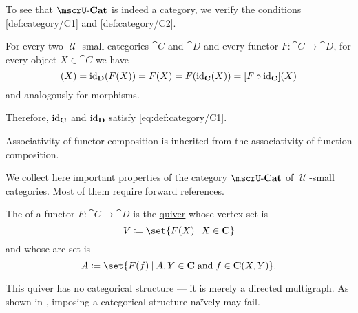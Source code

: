 \begin{defproof}
  To see that \( \ucat{Cat} \) is indeed a category, we verify the conditions \ref{def:category/C1} and \ref{def:category/C2}.

   For every two \( \mscrU \)-small categories \( \cat{C} \) and \( \cat{D} \) and every functor \( F: \cat{C} \to \cat{D} \), for every object \( X \in \cat{C} \) we have
  \begin{equation*}
    [\id_{\cat{D}} \bincirc F](X)
    =
    \id_{\cat{D}}(F(X))
    =
    F(X)
    =
    F(\id_{\cat{C}}(X))
    =
    [F \bincirc \id_{\cat{C}}](X)
  \end{equation*}
  and analogously for morphisms.

  Therefore, \( \operatorname{id}_{\operatorname{\mathbf{C}}} \) and \( \operatorname{id}_{\operatorname{\mathbf{D}}} \) satisfy \eqref{eq:def:category/C1}.

   Associativity of functor composition is inherited from the associativity of function composition.
\end{defproof}

\begin{proposition}\label{thm:category_of_small_categories_properites}
  We collect here important properties of the category \hyperref[def:category_of_small_categories]{\( \ucat{Cat} \)} of \( \mscrU \)-small categories. Most of them require forward references.
\end{proposition}

\begin{definition}\label{def:functor_image}
  The  of a functor \( F: \cat{C} \to \cat{D} \) is the \hyperref[def:quiver]{quiver} whose vertex set is
  \begin{equation*}
    V \coloneqq \set{ F(X) \given X \in \cat{C} }
  \end{equation*}
  and whose arc set is
  \begin{equation*}
    A \coloneqq \set{ F(f) \given A, Y \in \cat{C} \T{and} f \in \cat{C}(X, Y) }.
  \end{equation*}

  This quiver has no categorical structure --- it is merely a directed multigraph. As shown in , imposing a categorical structure na\"ively may fail.
\end{definition}

